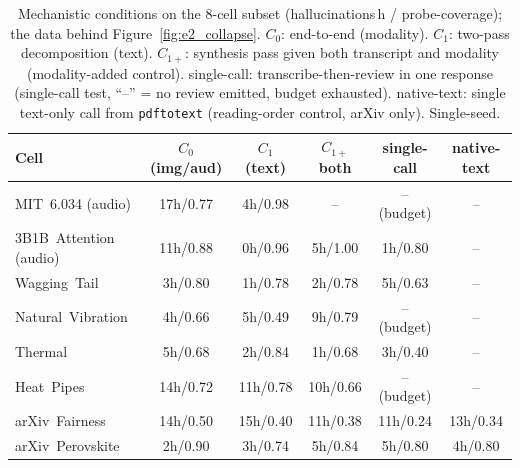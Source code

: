 \documentclass[11pt]{article}
\begin{document}
\begin{table}[h]
\small\centering
\caption{Mechanistic conditions on the 8-cell subset (hallucinations\,h / probe-coverage); the data behind Figure~\ref{fig:e2_collapse}. $C_0$: end-to-end (modality). $C_1$: two-pass decomposition (text). $C_{1+}$: synthesis pass given both transcript and modality (modality-added control). single-call: transcribe-then-review in one response (single-call test, ``--'' = no review emitted, budget exhausted). native-text: single text-only call from \texttt{pdftotext} (reading-order control, arXiv only). Single-seed.}
\label{tab:mech_cond}
\begin{tabular}{lccccc}
\toprule
Cell & $C_0$ (img/aud) & $C_1$ (text) & $C_{1+}$ both & single-call & native-text \\
\midrule
MIT~6.034 (audio)        & 17h/0.77 & 4h/0.98 & --        & -- (budget) & -- \\
3B1B~Attention (audio)   & 11h/0.88 & 0h/0.96 & 5h/1.00   & 1h/0.80     & -- \\
Wagging~Tail         & 3h/0.80  & 1h/0.78 & 2h/0.78   & 5h/0.63     & -- \\
Natural~Vibration   & 4h/0.66  & 5h/0.49 & 9h/0.79   & -- (budget) & -- \\
Thermal             & 5h/0.68  & 2h/0.84 & 1h/0.68   & 3h/0.40     & -- \\
Heat~Pipes         & 14h/0.72 & 11h/0.78& 10h/0.66  & -- (budget) & -- \\
arXiv~Fairness      & 14h/0.50 & 15h/0.40& 11h/0.38  & 11h/0.24    & 13h/0.34 \\
arXiv~Perovskite    & 2h/0.90  & 3h/0.74 & 5h/0.84   & 5h/0.80     & 4h/0.80 \\
\bottomrule
\end{tabular}
\end{table}
\end{document}
